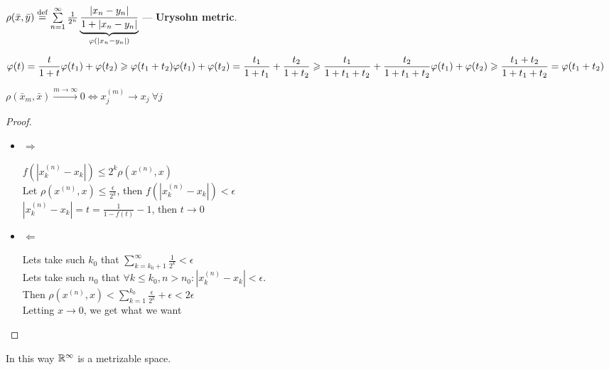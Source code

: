 \begin{defn}
  $\rho(\bar{x}, \bar{y}) \defeq \sum\limits_{n = 1}^\infty \frac{1}{2^n}\underbrace{\frac{|x_n - y_n|}{1 + |x_n - y_n|}}_{\phi(|x_n - y_n|)}$
  --- \textbf{Urysohn metric}.

  \noindent
  \begin{minipage}{.65\linewidth}
    $\displaystyle\phi(t) = \frac{t}{1 + t} \\ \\
    \phi(t_1) + \phi(t_2) \geq \phi(t_1 + t_2) \\ \\
    \phi(t_1) + \phi(t_2) = \frac{t_1}{1 + t_1} + \frac{t_2}{1 + t_2} \geq \frac{t_1}{1 + t_1 + t_2} + \frac{t_2}{1 + t_1 + t_2} \\ \\
    \phi(t_1) + \phi(t_2) \geq \frac{t_1 + t_2}{1 + t_1 + t_2} = \phi(t_1 + t_2)$
  \end{minipage}%
  \begin{minipage}{.35\linewidth}
  \end{minipage}
  \begin{stm}
    $\rho(\bar{x}_m, \bar{x}) \xrightarrow{m \to \infty} 0 \iff x_j^{(m)} \to x_j\ \forall j$\\
  \end{stm}
  \begin{proof}\leavevmode
    \begin{itemize}
      \item $\Rightarrow$

      $f(|x^{(n)}_k - x_k|) \leq 2^k \rho(x^{(n)}, x)$ \\
      Let $\rho(x^{(n)}, x) \le \frac{\epsilon}{2^k}$,  then  $f(|x^{(n)}_k - x_k|) < \epsilon$ \\
      $|x^{(n)}_k - x_k| = t = \frac{1}{1 - f(t)} - 1$, then $t \rightarrow 0$
      \item $\Leftarrow$

      Lets take such $k_0$ that $\sum\limits_{k=k_0+1}^{\infty} \frac{1}{2^k} < \epsilon$ \\
      Lets take such $n_0$ that  $\forall k \leq k_0, n > n_0: |x_k^{(n)} - x_k| < \epsilon$. \\ 
      Then $\rho(x^{(n)}, x) < \sum\limits_{k=1}^{k_0} \frac{\epsilon}{2^k} + \epsilon < 2 \epsilon$ \\
      Letting  $x \rightarrow 0$, we get what we want \qedhere
    \end{itemize}
  \end{proof}
  In this way $\R^\infty$ is a metrizable space.
\end{defn}
